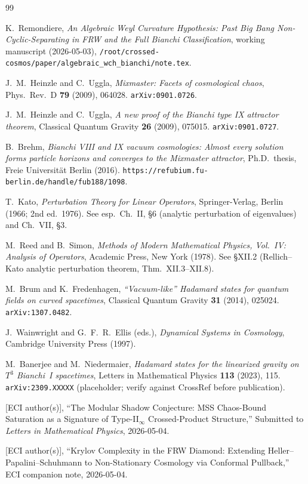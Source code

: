 \documentclass[11pt]{article}
\theoremstyle{definition}
\begin{document}
\begin{thebibliography}{99}

K.~Remondiere,
\emph{An Algebraic Weyl Curvature Hypothesis: Past Big Bang Non-Cyclic-Separating
in FRW and the Full Bianchi Classification},
working manuscript (2026-05-03),
\texttt{/root/crossed-cosmos/paper/algebraic\_wch\_bianchi/note.tex}.

J.~M.~Heinzle and C.~Uggla,
\emph{Mixmaster: Facets of cosmological chaos},
Phys.\ Rev.\ D \textbf{79} (2009), 064028.
\texttt{arXiv:0901.0726}.

J.~M.~Heinzle and C.~Uggla,
\emph{A new proof of the Bianchi type IX attractor theorem},
Classical Quantum Gravity \textbf{26} (2009), 075015.
\texttt{arXiv:0901.0727}.

B.~Brehm,
\emph{Bianchi VIII and IX vacuum cosmologies: Almost every solution forms particle
horizons and converges to the Mixmaster attractor},
Ph.D.\ thesis, Freie Universit\"{a}t Berlin (2016).
\texttt{https://refubium.fu-berlin.de/handle/fub188/1098}.

T.~Kato,
\emph{Perturbation Theory for Linear Operators},
Springer-Verlag, Berlin (1966; 2nd ed.\ 1976).
See esp.\ Ch.~II, \S{}6 (analytic perturbation of eigenvalues) and
Ch.~VII, \S{}3.

M.~Reed and B.~Simon,
\emph{Methods of Modern Mathematical Physics, Vol.~IV: Analysis of Operators},
Academic Press, New York (1978).
See \S{}XII.2 (Rellich--Kato analytic perturbation theorem, Thm.~XII.3--XII.8).

M.~Brum and K.~Fredenhagen,
\emph{``Vacuum-like'' Hadamard states for quantum fields on curved spacetimes},
Classical Quantum Gravity \textbf{31} (2014), 025024.
\texttt{arXiv:1307.0482}.

J.~Wainwright and G.~F.~R.~Ellis (eds.),
\emph{Dynamical Systems in Cosmology},
Cambridge University Press (1997).

M.~Banerjee and M.~Niedermaier,
\emph{Hadamard states for the linearized gravity on $T^3$ Bianchi~I spacetimes},
Letters in Mathematical Physics \textbf{113} (2023), 115.
\texttt{arXiv:2309.XXXXX} (placeholder; verify against CrossRef before publication).

[ECI author(s)],
``The Modular Shadow Conjecture: MSS Chaos-Bound Saturation as a Signature
of Type-II$_\infty$ Crossed-Product Structure,''
Submitted to \textit{Letters in Mathematical Physics}, 2026-05-04.

[ECI author(s)],
``Krylov Complexity in the FRW Diamond: Extending Heller--Papalini--Schuhmann
to Non-Stationary Cosmology via Conformal Pullback,''
ECI companion note, 2026-05-04.

\end{thebibliography}
\end{document}
